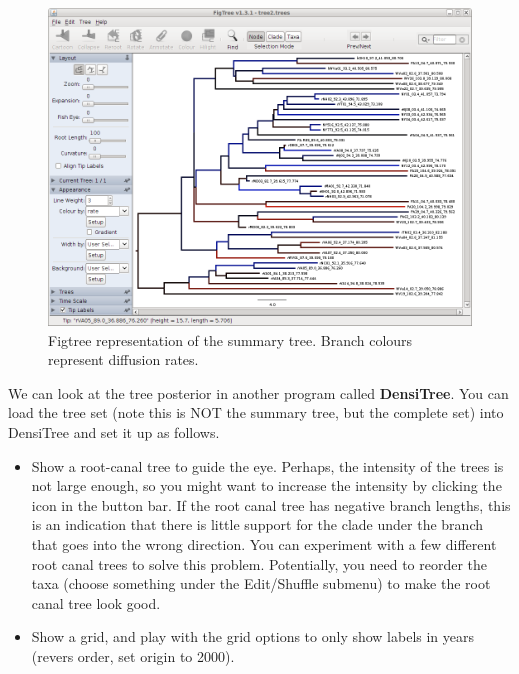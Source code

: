 \documentclass{article}
\begin{document}
\begin{figure}
\begin{center}

\includegraphics[width=\textwidth]{figures/figtree.png}

\end{center}
\caption{\label{fig.figtree} Figtree representation of the summary tree. Branch colours represent diffusion rates.}
\end{figure}
\fi

We can look at the tree posterior in another program called {\bf DensiTree}.
You can load the tree set (note this is NOT the summary tree, but the complete set) into DensiTree and set it up as follows.

\begin{itemize}
\item Show a root-canal tree to guide the eye. Perhaps, the intensity of the trees is not large enough, so you might want to increase the intensity by clicking the icon in the button bar. If the root canal tree has negative branch lengths, this is an indication that there is little support for the clade under the branch that goes into the wrong direction. You can experiment with a few different root canal trees to solve this problem. Potentially, you need to reorder the taxa (choose something under the Edit/Shuffle submenu) to make the root canal tree look good.
\item Show a grid, and play with the grid options to only show labels in years (revers order, set origin to 2000).
\end{itemize}
\end{document}
